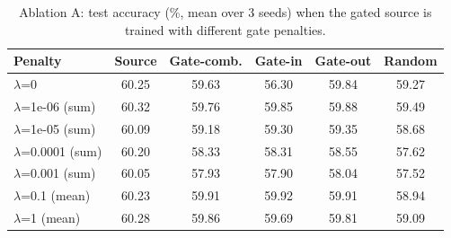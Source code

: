 \begin{table}[t]
\centering
\caption{Ablation A: test accuracy (\%, mean over 3 seeds) when the gated source is trained with different gate penalties.}
\label{tab:ablation_a}
\footnotesize
\setlength{\tabcolsep}{2.5pt}
\begin{tabular}{lccccc}
\toprule
Penalty & Source & Gate-comb. & Gate-in & Gate-out & Random \\
\midrule
$\lambda$=0 & 60.25 & 59.63 & 56.30 & 59.84 & 59.27 \\
$\lambda$=1e-06 (sum) & 60.32 & 59.76 & 59.85 & 59.88 & 59.49 \\
$\lambda$=1e-05 (sum) & 60.09 & 59.18 & 59.30 & 59.35 & 58.68 \\
$\lambda$=0.0001 (sum) & 60.20 & 58.33 & 58.31 & 58.55 & 57.62 \\
$\lambda$=0.001 (sum) & 60.05 & 57.93 & 57.90 & 58.04 & 57.52 \\
$\lambda$=0.1 (mean) & 60.23 & 59.91 & 59.92 & 59.91 & 58.94 \\
$\lambda$=1 (mean) & 60.28 & 59.86 & 59.69 & 59.81 & 59.09 \\
\bottomrule
\end{tabular}
\end{table}

